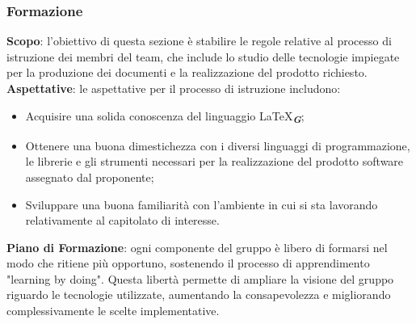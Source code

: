 \subsubsection{Formazione}
\textbf{Scopo}: l'obiettivo di questa sezione è stabilire le regole relative al processo di istruzione dei membri del team, 
che include lo studio delle tecnologie impiegate per la produzione dei documenti e la realizzazione del prodotto richiesto.
\textbf{Aspettative}: le aspettative per il processo di istruzione includono:
\begin{itemize}
    \item Acquisire una solida conoscenza del linguaggio \LaTeX\textsubscript{\textit{\textbf{G}}};
    \item Ottenere una buona dimestichezza con i diversi linguaggi di programmazione, le librerie e gli strumenti necessari per la realizzazione del prodotto software assegnato dal proponente;
    \item Sviluppare una buona familiarità con l'ambiente in cui si sta lavorando relativamente al capitolato di interesse.
\end{itemize}
\textbf{Piano di Formazione}: ogni componente del gruppo è libero di formarsi nel modo che ritiene più opportuno, sostenendo il processo di apprendimento "learning by doing". Questa libertà permette di ampliare la visione del gruppo riguardo le tecnologie utilizzate, aumentando la consapevolezza e migliorando complessivamente le scelte implementative.
